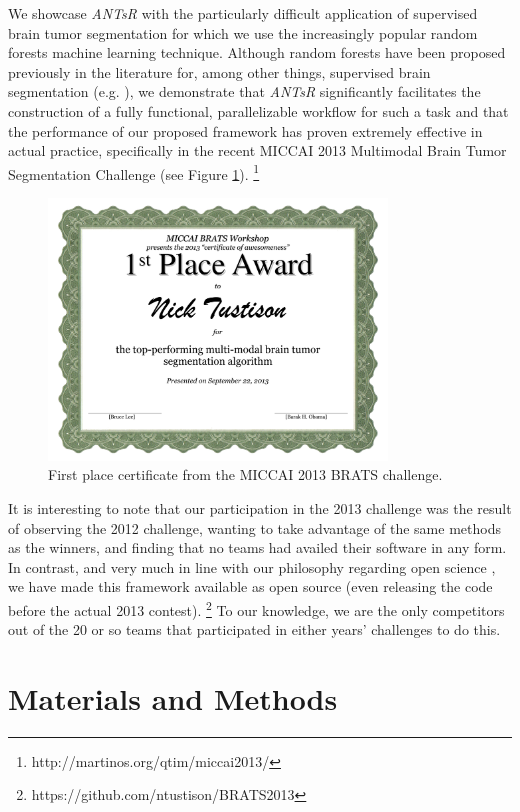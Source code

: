 \documentclass[final,5p,times,twocolumn]{elsarticle}
\begin{document}
We showcase \textit{ANTsR} with
the particularly difficult application of supervised brain tumor
segmentation \citep{bauer2013} for which we use the increasingly popular 
random forests machine learning technique.  Although random forests have
been proposed previously in the literature for, among other things, 
supervised brain segmentation (e.g. \cite{geremia2011}), 
we demonstrate that \textit{ANTsR} significantly facilitates the construction 
of a fully functional, parallelizable workflow for such a task and 
that the performance of our proposed framework has proven extremely effective in 
actual practice, specifically
 in the recent MICCAI 2013 Multimodal Brain Tumor Segmentation
Challenge (see Figure \ref{fig:award}).%
\footnote{
http://martinos.org/qtim/miccai2013/
}
\begin{figure}
  \centering
  \includegraphics[width=90mm]{Figures/award.pdf}
  \caption{First place certificate from the MICCAI 2013 BRATS challenge.}
  \label{fig:award}
\end{figure}

It is interesting to note that our participation in the 2013 challenge
was the result of observing the 2012
challenge, wanting to take advantage of the same methods as the winners,
and finding that no teams had availed their software in any form.  In contrast, 
and very much in line with our philosophy 
regarding open science \citep{tustison2013,ince2012}, we have made this framework available as open 
source (even releasing the code before the actual 2013 contest).%
\footnote{
https://github.com/ntustison/BRATS2013
}
To our knowledge, we are the only competitors out of the 20 or so teams 
that participated in either years' challenges to do this.

\section{Materials and Methods}
\end{document}

